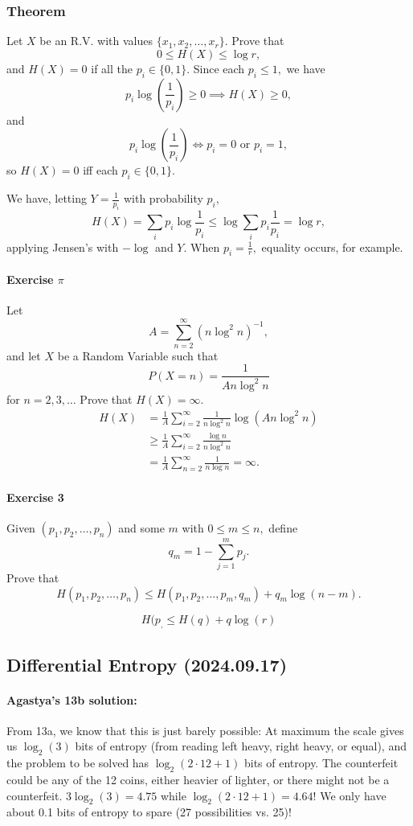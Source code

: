 \documentclass[12pt]{article}
\begin{document}
\subsubsection{Theorem}
Let $X$ be an R.V. with values $\{x_1,x_2,\dots,x_r\}.$
Prove that \[0\le H(X)\le \log r,\] and $H(X)=0$ if all the $p_i\in\{0,1\}.$
Since each $p_i\le 1,$ we have
\[p_i\log\left(\frac{1}{p_i}\right)\ge 0\implies H(X)\ge 0,\]
and \[p_i\log\left(\frac{1}{p_i}\right) \Longleftrightarrow p_i=0\text{ or }p_i=1,\] so $H(X)=0$ iff each $p_i\in\{0,1\}.$

We have, letting $Y=\frac{1}{p_i}$ with probability $p_i,$
\[H(X)=\sum_i p_i\log\frac{1}{p_i}\le \log\sum_i p_i\frac{1}{p_i}=\log r,\] applying Jensen's with $-\log$ and $Y.$ When $p_i=\frac{1}{r},$ equality occurs, for example.

\paragraph{Exercise $\pi$}
Let \[A=\sum_{n=2}^\infty\left(n\log^2n\right)^{-1},\]
and let $X$ be a Random Variable such that
\[P(X=n)=\frac{1}{An\log^2 n}\] for $n=2,3,\dots$
Prove that $H(X)=\infty.$
\begin{align*}
H(X)&=\frac{1}{A}\sum_{i=2}^\infty\frac{1}{n\log^2n}\log(An\log^2n)\\
&\ge\frac{1}{A}\sum_{i=2}^\infty\frac{\log n}{n\log^2 n}\\
&=\frac{1}{A}\sum_{n=2}^\infty\frac{1}{n\log n}=\infty.
\end{align*}


\paragraph{Exercise 3}
Given $(p_1,p_2,\dots,p_n)$ and some $m$ with $0\le m\le n,$
define
\[q_m=1-\sum_{j=1}^mp_j.\]
Prove that
\[H(p_1,p_2,\dots,p_n)\le H(p_1,p_2,\dots,p_m,q_m)+q_m\log(n-m).\]

\[H(p_, \le H(q)+ q \log(r)\]


\newpage
\subsection{Differential Entropy (2024.09.17)}
 \paragraph{Agastya's 13b solution:}
From 13a, we know that this is just barely possible: At maximum the scale gives us $\log_2(3)$ bits of entropy (from reading left heavy, right heavy, or equal), and the problem to be solved has $\log_2(2\cdot12+1)$ bits of entropy. The counterfeit could be any of the 12 coins, either heavier of lighter, or there might not be a counterfeit. $3\log_2(3) = 4.75$ while $\log_2(2\cdot12+1) = 4.64$! We only have about 0.1 bits of entropy to spare (27 possibilities vs. 25)!
\end{document}
